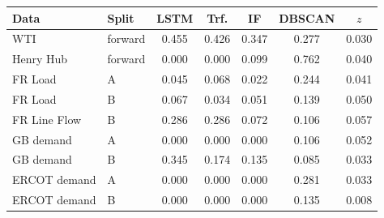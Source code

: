 \begin{tabular}{llccccc}
\toprule
Data & Split & LSTM & Trf. & IF & DBSCAN & $z$ \\
\midrule
WTI & forward & 0.455 & 0.426 & 0.347 & 0.277 & 0.030 \\
Henry Hub & forward & 0.000 & 0.000 & 0.099 & 0.762 & 0.040 \\
FR Load & A & 0.045 & 0.068 & 0.022 & 0.244 & 0.041 \\
FR Load & B & 0.067 & 0.034 & 0.051 & 0.139 & 0.050 \\
FR Line Flow & B & 0.286 & 0.286 & 0.072 & 0.106 & 0.057 \\
GB demand & A & 0.000 & 0.000 & 0.000 & 0.106 & 0.052 \\
GB demand & B & 0.345 & 0.174 & 0.135 & 0.085 & 0.033 \\
ERCOT demand & A & 0.000 & 0.000 & 0.000 & 0.281 & 0.033 \\
ERCOT demand & B & 0.000 & 0.000 & 0.000 & 0.135 & 0.008 \\
\bottomrule
\end{tabular}
